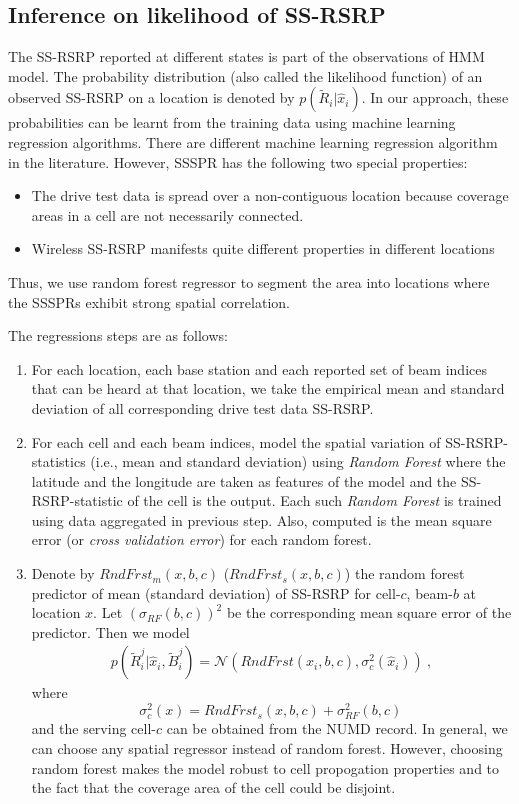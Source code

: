 \documentclass[conference, 10pt]{IEEEtran}
\begin{document}
\subsection{Inference on likelihood of SS-RSRP}
\label{sec:prob-reg}
The SS-RSRP reported at different states
is part of the observations of HMM model. The probability
distribution (also called the likelihood function) of an observed SS-RSRP on a location is denoted by
$p(\tilde{R}_i|\hat{x}_{i})$. In our approach, these probabilities
can be learnt from the training data using machine learning regression algorithms. 
There are different machine learning regression algorithm in the literature.
However, SSSPR has the following two special properties:
\begin{itemize}
	\item The drive test data is spread over a non-contiguous location because coverage
	areas in a cell are not necessarily connected.
	\item  Wireless SS-RSRP manifests quite different properties in different locations
\end{itemize}

Thus, we use random forest regressor to segment the area into locations where the SSSPRs
exhibit strong spatial correlation. 

The regressions steps are as follows:

\begin{enumerate}
\item For each location, each base station and each reported set of beam indices that can be heard at that location, we
take the empirical mean and standard deviation of all corresponding drive test data
SS-RSRP. 

\item For each cell and each beam indices, model the spatial variation of SS-RSRP-statistics (i.e., mean and
standard deviation) using {\em Random Forest} where the latitude and the longitude are 
taken as features of the model and the SS-RSRP-statistic  of the cell is the output. Each such {\em
Random Forest} is trained using data aggregated in previous step. Also,
computed is the mean square error (or {\em cross validation error})
for each random forest. 

\item Denote by $RndFrst_m(x,b,c)$ ($RndFrst_s(x,b,c)$) the random forest predictor of
mean (standard deviation) of SS-RSRP for cell-$c$, beam-$b$
at location $x$. Let $(\sigma_{RF}(b,c))^2$ be the corresponding
mean square error of the predictor. Then we model
\begin{align}
p(\tilde{R}^j_i|\hat{x}_{i}, \tilde{B}^j_i) =
\mathcal{N}(RndFrst(\hat{x}_{i},b,c), \sigma_c^2(\hat{x}_i))\ ,
\label{eqn:rndfrst}
\end{align}
where $$\sigma_c^2(x) = RndFrst_s(x,b,c) + \sigma_{RF}^2(b,c)\,$$ 
and the serving cell-$c$ can be obtained from the NUMD record. In general, we
can choose any spatial regressor instead of random forest. However, choosing
random forest makes the model robust to cell propogation properties and to the
fact that the coverage area of the cell could be disjoint.
\end{enumerate}
\end{document}
